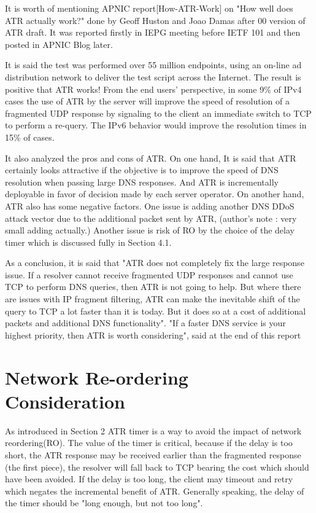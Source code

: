    It is worth of mentioning APNIC report[How-ATR-Work] on "How well
   does ATR actually work?" done by Geoff Huston and Joao Damas after 00
   version of ATR draft.  It was reported firstly in IEPG meeting before
   IETF 101 and then posted in APNIC Blog later.

   It is said the test was performed over 55 million endpoints, using an
   on-line ad distribution network to deliver the test script across the
   Internet.  The result is positive that ATR works!  From the end
   users' perspective, in some 9\% of IPv4 cases the use of ATR by the
   server will improve the speed of resolution of a fragmented UDP
   response by signaling to the client an immediate switch to TCP to
   perform a re-query.  The IPv6 behavior would improve the resolution
   times in 15\% of cases.

   It also analyzed the pros and cons of ATR.  On one hand, It is said
   that ATR certainly looks attractive if the objective is to improve
   the speed of DNS resolution when passing large DNS responses.  And
   ATR is incrementally deployable in favor of decision made by each
   server operator.  On another hand, ATR also has some negative
   factors.  One issue is adding another DNS DDoS attack vector due to
   the additional packet sent by ATR, (author's note : very small adding
   actually.)  Another issue is risk of RO by the choice of the delay
   timer which is discussed fully in Section 4.1.

   As a conclusion, it is said that "ATR does not completely fix the
   large response issue.  If a resolver cannot receive fragmented UDP
   responses and cannot use TCP to perform DNS queries, then ATR is not
   going to help.  But where there are issues with IP fragment
   filtering, ATR can make the inevitable shift of the query to TCP a
   lot faster than it is today.  But it does so at a cost of additional
   packets and additional DNS functionality".  "If a faster DNS service
   is your highest priority, then ATR is worth considering", said at the
   end of this report


\section{Network Re-ordering Consideration}


As introduced in Section 2 ATR timer is a way to avoid the impact of
network reordering(RO).  The value of the timer is critical, because
if the delay is too short, the ATR response may be received earlier
than the fragmented response (the first piece), the resolver will
fall back to TCP bearing the cost which should have been avoided.  If
the delay is too long, the client may timeout and retry which negates
the incremental benefit of ATR.  Generally speaking, the delay of the
timer should be "long enough, but not too long".


